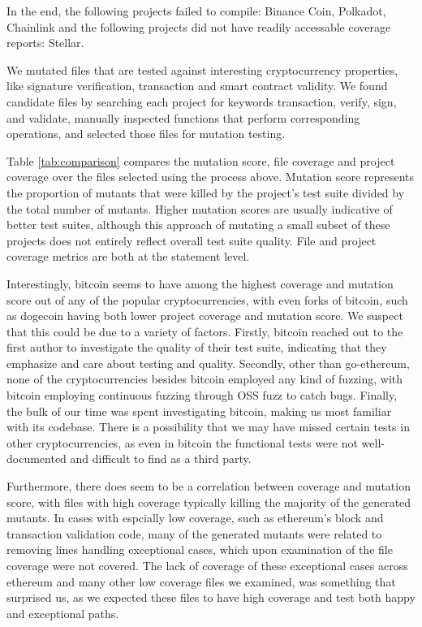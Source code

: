 In the end, the following projects failed to compile: Binance Coin, Polkadot, Chainlink and the following projects did not have
readily accessable coverage reports: Stellar.

We mutated files that are tested against interesting cryptocurrency properties, like signature verification, transaction and smart contract validity.
We found candidate files by searching each project for keywords transaction, verify, sign, and validate, manually inspected functions that perform corresponding operations,
and selected those files for mutation testing.

Table \ref{tab:comparison} compares the mutation score, file coverage and project coverage over the files selected using the process above. Mutation score represents the proportion
of mutants that were killed by the project's test suite divided by the total number of mutants. Higher mutation scores are usually indicative of better test suites, although this approach
of mutating a small subset of these projects does not entirely reflect overall test suite quality. File and project coverage metrics are both at the statement level.

Interestingly, bitcoin seems to have among the highest coverage and mutation score out of any of the popular cryptocurrencies, with even forks of bitcoin, such as dogecoin having both lower
project coverage and mutation score. We suspect that this could be due to a variety of factors. Firstly, bitcoin reached out to the first author to investigate the quality of their test suite,
indicating that they emphasize and care about testing and quality. Secondly, other than go-ethereum, none of the cryptocurrencies besides bitcoin employed any kind of fuzzing, with bitcoin
employing continuous fuzzing through OSS fuzz to catch bugs. Finally, the bulk of our time was spent investigating bitcoin, making us most familiar with its codebase. There is a possibility
that we may have missed certain tests in other cryptocurrencies, as even in bitcoin the functional tests were not well-documented and difficult to find as a third party.

Furthermore, there does seem to be a correlation between coverage and mutation score, with files with high coverage typically killing the majority of the generated mutants. In cases with espcially
low coverage, such as ethereum's block and transaction validation code, many of the generated mutants were related to removing lines handling exceptional cases, which upon examination of the
file coverage were not covered. The lack of coverage of these exceptional cases across ethereum and many other low coverage files we examined, was something that surprised us, as we expected these files to have
high coverage and test both happy and exceptional paths.

